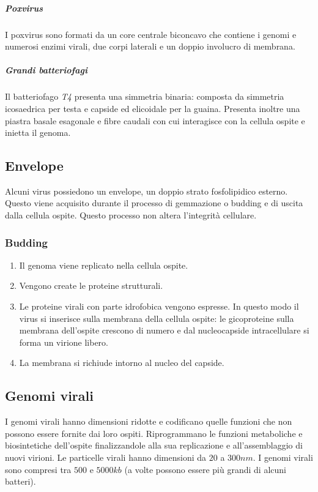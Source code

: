 				\subparagraph{Poxvirus}
				I poxvirus sono formati da un core centrale biconcavo che contiene i genomi e numerosi enzimi virali, due corpi laterali e un doppio involucro di membrana.

				\subparagraph{Grandi batteriofagi}
				Il batteriofago \emph{T4} presenta una simmetria binaria: composta da simmetria icosaedrica per testa e capside ed elicoidale per la guaina.
				Presenta inoltre una piastra basale esagonale e fibre caudali con cui interagisce con la cellula ospite e inietta il genoma.

	\subsection{Envelope}
	Alcuni virus possiedono un envelope, un doppio strato fosfolipidico esterno.
	Questo viene acquisito durante il processo di gemmazione o budding e di uscita dalla cellula ospite.
	Questo processo non altera l'integrit\`a cellulare.
		
		\subsubsection{Budding}
		\begin{multicols}{2}
			\begin{enumerate}
   					\item Il genoma viene replicato nella cellula ospite.
   					\item Vengono create le proteine strutturali.
   					\item Le proteine virali con parte idrofobica vengono espresse. 
					In questo modo il virus si inserisce sulla membrana della cellula ospite: le gicoproteine sulla membrana dell'ospite crescono di numero e dal nucleocapside intracellulare si forma un virione libero.
				\item La membrana si richiude intorno al nucleo del capside.
			\end{enumerate}
		\end{multicols}
		
	\subsection{Genomi virali}
	I genomi virali hanno dimensioni ridotte e codificano quelle funzioni che non possono essere fornite dai loro ospiti. 
	Riprogrammano le funzioni metaboliche e biosintetiche dell'ospite finalizzandole alla sua replicazione e all'assemblaggio di nuovi virioni. 
	Le particelle virali hanno dimensioni da $20$ a $300 \si{nm}$.
	I genomi virali sono compresi tra $500$ e $5000 kb$ (a volte possono essere pi\`u grandi di alcuni batteri).

